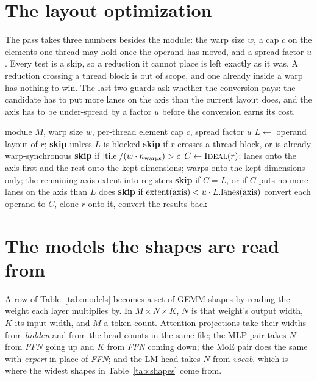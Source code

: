 \documentclass[sigplan,nonacm]{acmart}
\begin{document}
\section{The layout optimization}
\label{app:layout}

The pass takes three numbers besides the module: the warp size $w$, a cap $c$ on
the elements one thread may hold once the operand has moved, and a spread factor
$u$. Every test is a skip, so a reduction it cannot place is left exactly as it
was. A reduction crossing a thread block is out of scope, and one already inside
a warp has nothing to win. The last two guards ask whether the conversion pays:
the candidate has to put more lanes on the axis than the current layout does,
and the axis has to be under-spread by a factor $u$ before the conversion earns
its cost.

\begin{algorithm}[H]
\caption{The layout optimization for a pinned reduction.}
\label{alg:layout}
\small
\begin{algorithmic}[1]
\Require module $M$, warp size $w$, per-thread element cap $c$, spread factor $u$
  \State $L \gets$ operand layout of $r$; \textbf{skip} unless $L$ is blocked
  \State \textbf{skip} if $r$ crosses a thread block, or is already warp-synchronous
  \State \textbf{skip} if $|{\rm tile}| / (w \cdot n_{\rm warps}) > c$
  \State $C \gets \textsc{Ideal}(r)$: lanes onto the axis first and the rest onto
         the kept dimensions; warps onto the kept dimensions only; the remaining
         axis extent into registers
  \State \textbf{skip} if $C = L$, or if $C$ puts no more lanes on the axis than
         $L$ does
  \State \textbf{skip} if ${\rm extent}({\rm axis}) < u \cdot L.{\rm lanes}({\rm axis})$
  \State convert each operand to $C$, clone $r$ onto it, convert the results back
\EndFor
\end{algorithmic}
\end{algorithm}

\section{The models the shapes are read from}
\label{app:models}

A row of Table~\ref{tab:models} becomes a set of GEMM shapes by reading the
weight each layer multiplies by. In $M \times N \times K$, $N$ is that weight's
output width, $K$ its input width, and $M$ a token count. Attention projections
take their widths from \emph{hidden} and from the head counts in the same file;
the MLP pair takes $N$ from \emph{FFN} going up and $K$ from \emph{FFN} coming
down; the MoE pair does the same with \emph{expert} in place of \emph{FFN}; and
the LM head takes $N$ from \emph{vocab}, which is where the widest shapes in
Table~\ref{tab:shapes} come from.
\end{document}
